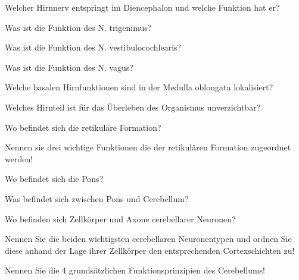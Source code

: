 \documentclass[10pt, a4paper]{exam}
\begin{document}
\begin{questions}
  \begin{solution}
  \end{solution}
  \question Welcher Hirnnerv entspringt im Diencephalon und welche Funktion hat er?
  \begin{solution}
  \end{solution}
  \question Was ist die Funktion des N. trigenimus?
  \begin{solution}
  \end{solution}
  \question Was ist die Funktion des N. vestibulocochlearis?
  \begin{solution}
  \end{solution}
  \question Was ist die Funktion des N. vagus?
  \begin{solution}
  \end{solution}
  \question Welche basalen Hirnfunktionen sind in der Medulla oblongata lokalisiert?
  \begin{solution}
  \end{solution}
  \question Welches Hirnteil ist für das Überleben des Organismus unverzichtbar?
  \begin{solution}
  \end{solution}
  \question Wo befindet sich die retikuläre Formation?
  \begin{solution}
  \end{solution}
  \question Nennen sie drei wichtige Funktionen die der retikulären Formation zugeordnet werden!
  \begin{solution}
  \end{solution}
  \question Wo befindet sich die Pons?
  \begin{solution}
  \end{solution}
  \question Was befindet sich zwischen Pons und Cerebellum?
  \begin{solution}
  \end{solution}
  \question Wo befinden sich Zellkörper und Axone cerebellarer Neuronen?
  \begin{solution}
  \end{solution}
  \question Nennen Sie die beiden wichtigsten cerebellaren Neuronentypen und ordnen Sie diese anhand der Lage ihrer Zellkörper den entsprechenden Cortexschichten zu!
  \begin{solution}
  \end{solution}
  \question Nennen Sie die 4 grundsätzlichen Funktionsprinzipien des Cerebellums!
  \begin{solution}
  \end{solution}

\end{questions}
\end{document}
